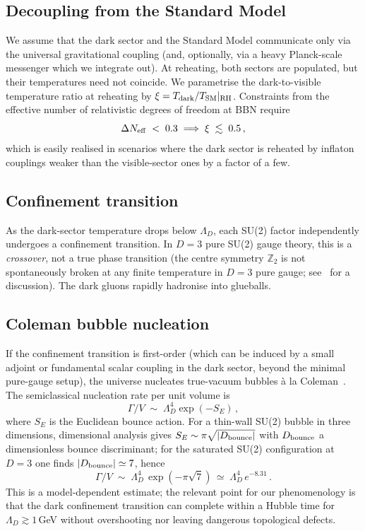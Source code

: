 \documentclass[aps,prd,twocolumn,nofootinbib,superscriptaddress,floatfix]{revtex4-2}
\begin{document}
\subsection{Decoupling from the Standard Model}
We assume that the dark sector and the Standard Model communicate only via the universal gravitational coupling (and, optionally, via a heavy Planck-scale messenger which we integrate out). At reheating, both sectors are populated, but their temperatures need not coincide. We parametrise the dark-to-visible temperature ratio at reheating by $\xi = T_{\rm dark}/T_{\rm SM}|_{\rm RH}$. Constraints from the effective number of relativistic degrees of freedom at BBN require
\begin{equation}
    \Delta N_{\rm eff} \;<\; 0.3 \;\Longrightarrow\; \xi \;\lesssim\; 0.5\,,
\end{equation}
which is easily realised in scenarios where the dark sector is reheated by inflaton couplings weaker than the visible-sector ones by a factor of a few.

\subsection{Confinement transition}
As the dark-sector temperature drops below $\Lambda_D$, each SU(2) factor independently undergoes a confinement transition. In $D=3$ pure SU(2) gauge theory, this is a \emph{crossover}, not a true phase transition (the centre symmetry $\mathbb{Z}_2$ is not spontaneously broken at any finite temperature in $D=3$ pure gauge; see~\cite{Teper1999} for a discussion). The dark gluons rapidly hadronise into glueballs.

\subsection{Coleman bubble nucleation}
If the confinement transition is first-order (which can be induced by a small adjoint or fundamental scalar coupling in the dark sector, beyond the minimal pure-gauge setup), the universe nucleates true-vacuum bubbles à la Coleman~\cite{Coleman1977}. The semiclassical nucleation rate per unit volume is
\begin{equation}
    \Gamma/V \;\sim\; \Lambda_D^4 \exp(-S_E)\,,
\end{equation}
where $S_E$ is the Euclidean bounce action. For a thin-wall SU(2) bubble in three dimensions, dimensional analysis gives $S_E \sim \pi \sqrt{|D_{\rm bounce}|}$ with $D_{\rm bounce}$ a dimensionless bounce discriminant; for the saturated SU(2) configuration at $D=3$ one finds $|D_{\rm bounce}|\simeq 7$, hence
\begin{equation}
    \Gamma/V \;\sim\; \Lambda_D^4\,\exp(-\pi\sqrt{7})\,\simeq\;\Lambda_D^4\,e^{-8.31}\,.
\end{equation}
This is a model-dependent estimate; the relevant point for our phenomenology is that the dark confinement transition can complete within a Hubble time for $\Lambda_D\gtrsim 1\,$GeV without overshooting nor leaving dangerous topological defects.
\end{document}
